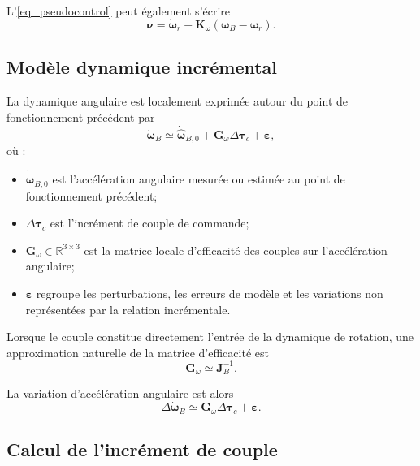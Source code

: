 \documentclass[11pt,a4paper,oneside]{report}
\newcommand{\vect}[1]{\bm{#1}}
\newcommand{\mat}[1]{\bm{#1}}
\begin{document}
L'\cref{eq_pseudocontrol} peut également s'écrire
\begin{equation}
	\vect\nu
	=
	\dot{\vect\omega}_r
	-
	\mat K_\omega
	\left(
	\vect\omega_B-\vect\omega_r
	\right).
\end{equation}

\subsection{Modèle dynamique incrémental}

La dynamique angulaire est localement exprimée autour du point de fonctionnement précédent par
\begin{equation}
	\dot{\vect\omega}_B
	\simeq
	\dot{\hat{\vect\omega}}_{B,0}
	+
	\mat G_\omega\Delta\vect\tau_c
	+
	\vect\varepsilon,
	\label{eq_incremental_angular_dynamics}
\end{equation}
où :

\begin{itemize}
	\item $\dot{\hat{\vect\omega}}_{B,0}$ est l'accélération angulaire mesurée ou estimée au point de fonctionnement précédent;
	\item $\Delta\vect\tau_c$ est l'incrément de couple de commande;
	\item $\mat G_\omega\in\mathbb{R}^{3\times3}$ est la matrice locale d'efficacité des couples sur l'accélération angulaire;
	\item $\vect\varepsilon$ regroupe les perturbations, les erreurs de modèle et les variations non représentées par la relation incrémentale.
\end{itemize}

Lorsque le couple constitue directement l'entrée de la dynamique de rotation, une approximation naturelle de la matrice d'efficacité est
\begin{equation}
	\mat G_\omega
	\simeq
	\mat J_B^{-1}.
	\label{eq_angular_control_effectiveness}
\end{equation}

La variation d'accélération angulaire est alors
\begin{equation}
	\Delta\dot{\vect\omega}_B
	\simeq
	\mat G_\omega\Delta\vect\tau_c
	+
	\vect\varepsilon.
	\label{eq_incremental_dynamics}
\end{equation}

\subsection{Calcul de l'incrément de couple}
\end{document}
